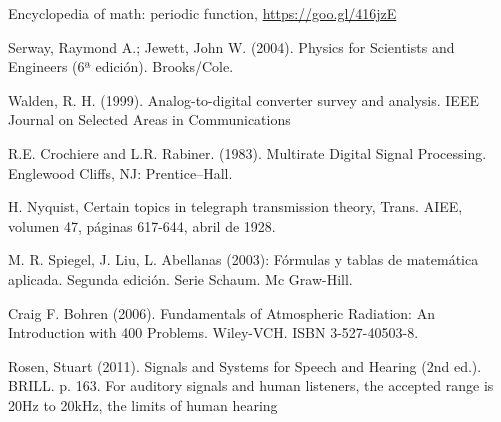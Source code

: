 \documentclass[comsoc, journal]{IEEEtran}
\begin{document}
\ifCLASSOPTIONcaptionsoff
  \newpage
\fi

\begin{thebibliography}{1}

Encyclopedia of math: periodic function,
\url{https://goo.gl/416jzE}

Serway, Raymond A.; Jewett, John W. (2004). Physics for Scientists and Engineers (6ª edición). Brooks/Cole.

Walden, R. H. (1999). Analog-to-digital converter survey and analysis. IEEE Journal on Selected Areas in Communications

R.E. Crochiere and L.R. Rabiner. (1983). Multirate Digital Signal Processing. Englewood Cliffs, NJ: Prentice–Hall.

H. Nyquist, Certain topics in telegraph transmission theory, Trans. AIEE, volumen 47, páginas 617-644, abril de 1928.

M. R. Spiegel, J. Liu, L. Abellanas (2003): Fórmulas y tablas de matemática aplicada. Segunda edición. Serie Schaum. Mc Graw-Hill.

Craig F. Bohren (2006). Fundamentals of Atmospheric Radiation: An Introduction with 400 Problems. Wiley-VCH. ISBN 3-527-40503-8.

Rosen, Stuart (2011). Signals and Systems for Speech and Hearing (2nd ed.). BRILL. p. 163. For auditory signals and human listeners, the accepted range is 20Hz to 20kHz, the limits of human hearing

\end{thebibliography}
\end{document}
